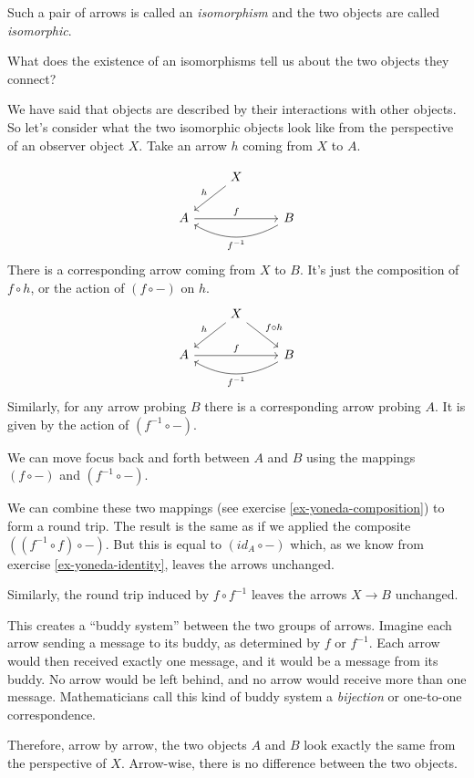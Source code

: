 \documentclass[DaoFP]{subfiles}
\begin{document}
Such a pair of arrows is called an \emph{isomorphism} and the two objects are called \emph{isomorphic}.

What does the existence of an isomorphisms tell us about the two objects they connect? 

We have said that objects are described by their interactions with other objects. So let's consider what the two isomorphic objects look like from the perspective of an observer object $X$. Take an arrow $h$ coming from $X$ to $A$.

\[
 \begin{tikzcd}
 & X
 \arrow[ld, "h"']
 \\
 A
 \arrow[rr, "f"]
  && B
 \arrow[ll, bend left,  "f^{-1}"]
 \end{tikzcd}
\]
There is a corresponding arrow coming from $X$ to $B$. It's just the composition of $f \circ h$, or the action of $(f \circ -)$ on $h$.
\[
 \begin{tikzcd}
 & X
 \arrow[ld, "h"']
 \arrow[rd, "f \circ h"]
 \\
 A
 \arrow[rr, "f"]
  && B
 \arrow[ll, bend left,  "f^{-1}"]
 \end{tikzcd}
\]
Similarly, for any arrow probing $B$ there is a corresponding arrow probing $A$. It is given by the action of  $(f^{-1} \circ -)$. 

We can move focus back and forth between $A$ and $B$ using the mappings $(f \circ -)$ and $(f^{-1} \circ -)$.

We can combine these two mappings (see exercise \ref{ex-yoneda-composition}) to form a round trip. The result is the same as if we applied the composite $((f^{-1} \circ f) \circ -)$. But this is equal to $(id_A \circ  -)$ which, as we know from exercise \ref{ex-yoneda-identity}, leaves the arrows unchanged.

Similarly, the round trip induced by $f \circ f^{-1}$ leaves the arrows $X \to B$ unchanged. 

This creates a ``buddy system'' between the two groups of arrows. Imagine each arrow sending a message to its buddy, as determined by $f$ or $f^{-1}$. Each arrow would then received exactly one message, and it would be a message from its buddy. No arrow would be left behind, and no arrow would receive more than one message. Mathematicians call this kind of buddy system a \emph{bijection} or one-to-one correspondence.

Therefore, arrow by arrow, the two objects $A$ and $B$ look exactly the same from the perspective of $X$. Arrow-wise, there is no difference between the two objects. 
\end{document}
